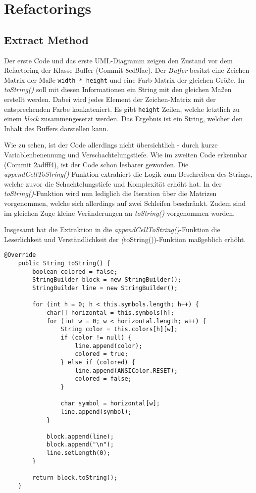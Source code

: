 \section{Refactorings}
\subsection*{Extract Method}
Der erste Code und das erste UML-Diagramm zeigen den Zustand vor
dem Refactoring der Klasse Buffer (Commit 8ed9fae). Der \textit{Buffer}
besitzt eine Zeichen-Matrix der Maße \texttt{width * height} und
eine Farb-Matrix der gleichen Größe. In \textit{toString()} soll mit
diesen Informationen ein String mit den gleichen Maßen erstellt werden.
Dabei wird jedes Element der Zeichen-Matrix mit der entsprechenden
Farbe konkateniert. Es gibt \texttt{height} Zeilen, welche letztlich
zu einem \textit{block} zusammengesetzt werden. Das Ergebnis ist ein
String, welcher den Inhalt des Buffers darstellen kann.

Wie zu sehen, ist der Code allerdings nicht übersichtlich - durch
kurze Variablenbenennung und Verschachtelungstiefe. Wie im zweiten
Code erkennbar (Commit 2adfff4), ist der Code schon lesbarer geworden.
Die \textit{appendCellToString()}-Funktion extrahiert die Logik
zum Beschreiben des Strings, welche zuvor die Schachtelungstiefe
und Komplexität erhöht hat. In der \textit{toString()}-Funktion
wird nun lediglich die Iteration über die Matrizen vorgenommen,
welche sich allerdings auf zwei Schleifen beschränkt. Zudem sind
im gleichen Zuge kleine Veränderungen an \textit{toString()}
vorgenommen worden.

Insgesamt hat die Extraktion in die \textit{appendCellToString()}-Funktion
die Leserlichkeit und Verständlichkeit der \textit(toString())-Funktion
maßgeblich erhöht.

\vspace{0.5cm}
\begin{lstlisting}[caption={Refactorings: Extract Method (Vorher)}]
    @Override
    public String toString() {
        boolean colored = false;
        StringBuilder block = new StringBuilder();
        StringBuilder line = new StringBuilder();
        
        for (int h = 0; h < this.symbols.length; h++) {
            char[] horizontal = this.symbols[h];
            for (int w = 0; w < horizontal.length; w++) {
                String color = this.colors[h][w];
                if (color != null) {
                    line.append(color);
                    colored = true;
                } else if (colored) {
                    line.append(ANSIColor.RESET);
                    colored = false;
                }
                
                char symbol = horizontal[w];
                line.append(symbol);
            }
            
            block.append(line);
            block.append("\n");
            line.setLength(0);
        }
        
        return block.toString();
    }
\end{lstlisting}

